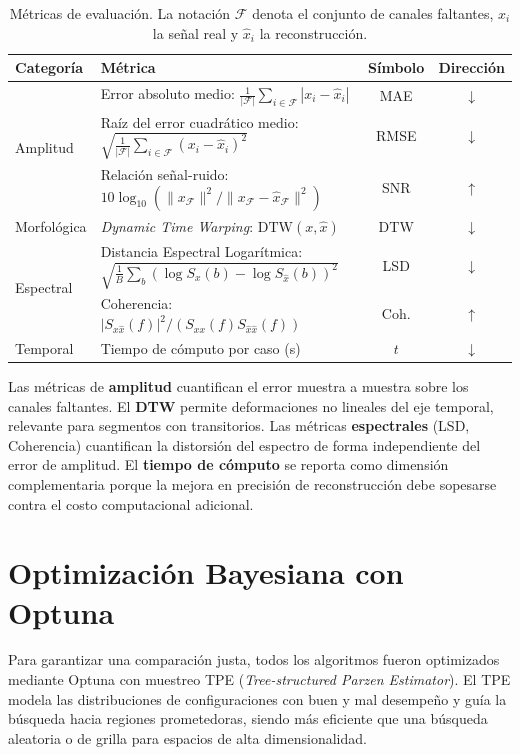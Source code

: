 \begin{table}[htbp]
\centering
\caption{Métricas de evaluación. La notación $\mathcal{F}$ denota el conjunto de canales faltantes, $x_i$ la señal real y $\hat{x}_i$ la reconstrucción.}
\label{tab:metrics}
\footnotesize
\begin{tabular}{@{}p{2.0cm}p{6.7cm}cc@{}}
\toprule
Categoría & Métrica & Símbolo & Dirección \\
\midrule
\multirow{3}{*}{Amplitud} 
& Error absoluto medio: $\frac{1}{|\mathcal{F}|}\sum_{i\in\mathcal{F}}|x_i-\hat{x}_i|$ 
& MAE & $\downarrow$ \\
& Raíz del error cuadrático medio: $\sqrt{\frac{1}{|\mathcal{F}|}\sum_{i\in\mathcal{F}}(x_i-\hat{x}_i)^2}$ 
& RMSE & $\downarrow$ \\
& Relación señal-ruido: $10\log_{10}(\|x_{\mathcal{F}}\|^2/\|x_{\mathcal{F}}-\hat{x}_{\mathcal{F}}\|^2)$ 
& SNR & $\uparrow$ \\
\midrule
Morfológica 
& \textit{Dynamic Time Warping}: $\mathrm{DTW}(x,\hat{x})$ 
& DTW & $\downarrow$ \\
\midrule
\multirow{2}{*}{Espectral} 
& Distancia Espectral Logarítmica: $\sqrt{\frac{1}{B}\sum_b (\log S_x(b)-\log S_{\hat{x}}(b))^2}$ 
& LSD & $\downarrow$ \\
& Coherencia: $|S_{x\hat{x}}(f)|^2/(S_{xx}(f)S_{\hat{x}\hat{x}}(f))$ 
& Coh. & $\uparrow$ \\
\midrule
Temporal & Tiempo de cómputo por caso (s) & $t$ & $\downarrow$ \\
\bottomrule
\end{tabular}
\end{table}

Las métricas de \textbf{amplitud} cuantifican el error muestra a muestra sobre los canales faltantes. El \textbf{DTW} permite deformaciones no lineales del eje temporal, relevante para segmentos con transitorios. Las métricas \textbf{espectrales} (LSD, Coherencia) cuantifican la distorsión del espectro de forma independiente del error de amplitud. El \textbf{tiempo de cómputo} se reporta como dimensión complementaria porque la mejora en precisión de reconstrucción debe sopesarse contra el costo computacional adicional.

\section{Optimización Bayesiana con Optuna}
\label{sec:optuna}

Para garantizar una comparación justa, todos los algoritmos fueron optimizados mediante Optuna \cite{akiba2019optuna} con muestreo TPE (\textit{Tree-structured Parzen Estimator}). El TPE modela las distribuciones de configuraciones con buen y mal desempeño y guía la búsqueda hacia regiones prometedoras, siendo más eficiente que una búsqueda aleatoria o de grilla para espacios de alta dimensionalidad.

